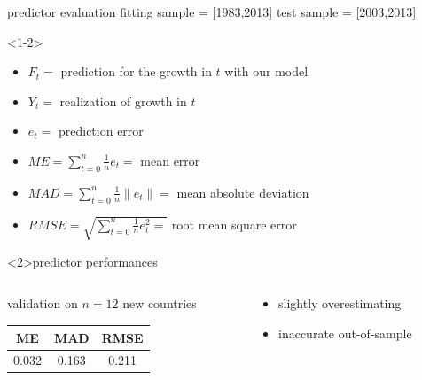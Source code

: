 \documentclass[9pt]{beamer}
\begin{document}
\begin{frame}{predictor evaluation}
	fitting sample = [1983,2013] \qquad test sample = [2003,2013]
	\begin{definition}<1-2>
		\begin{itemize}
			\item $F_t =$ prediction for the growth in $t$ with our model
			\item $Y_t =$ realization of growth in $t$
			\item $e_t =$ prediction error
			\item $ME = \sum_{t=0}^{n}\frac{1}{n}e_t =$ mean error 
			\item $MAD = \sum_{t=0}^{n}\frac{1}{n}\|e_t\| = $ mean absolute deviation 
			\item $ RMSE = \sqrt{\sum_{t=0}^{n}\frac{1}{n}e_t^{2} =}$ root mean square error
		\end{itemize}
		
	\end{definition}
	\begin{block}{predictor performances}
	\begin{columns}
		\begin{column}{5cm}
		
		validation on $n = 12$ new countries
		
		
		\begin{table}[h!]
			\centering
			\begin{tabular}{|c c c |} 
				\hline
				ME & MAD & RMSE  \\ [0.5ex] 
				\hline\hline
				0.032 & 0.163 & 0.211  \\ 
				
				\hline
			\end{tabular}
		\end{table}
		
		
		
		
	\end{column}
	\begin{column}{3cm}
		\begin{itemize}
			\item slightly overestimating
			\item inaccurate out-of-sample
		\end{itemize}
	\end{column}
    \end{columns}
	\end{block}	
	
	
\end{frame}
\end{document}
